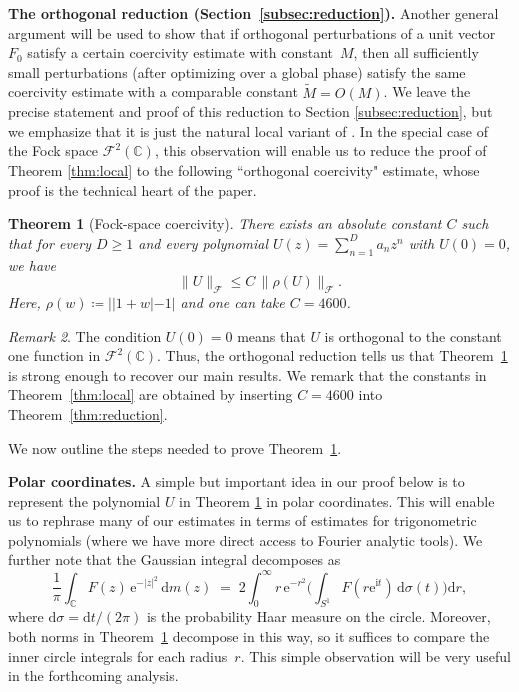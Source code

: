 \documentclass[11pt]{amsart}
\newtheorem{theorem}{Theorem}[section]
\theoremstyle{remark}
\newtheorem{remark}[theorem]{Remark}
\newcommand{\norm}[1]{\lVert #1 \rVert}
\begin{document}
\noindent
\textbf{The orthogonal reduction (Section~\ref{subsec:reduction}).}\;
Another general argument will be used to show that if orthogonal perturbations
of a unit vector $F_0$ satisfy a certain coercivity estimate with constant~$M$,
then all sufficiently small perturbations (after optimizing over a global
phase) satisfy the same coercivity estimate with a comparable constant $\widetilde{M} = O(M)$. We leave the precise statement and proof of this reduction to Section \ref{subsec:reduction}, but we emphasize that it is just the natural local variant of \cite[Theorem 3.10]{MR4800909}. In the special case of the Fock space $\mathcal{F}^2(\mathbb{C})$, this observation will enable us to reduce the proof of Theorem
\ref{thm:local} to the following ``orthogonal
coercivity" estimate, whose proof is the technical heart of the paper.

\begin{theorem}[Fock-space coercivity]\label{thm:orthog}
There exists an absolute constant $C$ such that for every $D \ge 1$ and every polynomial
$U(z) = \sum_{n=1}^D a_n z^n$ with $U(0) = 0$, we have
\[
  \norm{U}_{\mathcal{F}} \le C\,\norm{\rho(U)}_{\mathcal{F}}.
\]
Here, $\rho(w)\coloneq ||1+w|-1|$ and one can take $C = 4600$.
\end{theorem}
\begin{remark}
  The condition $U(0) = 0$ means that $U$ is orthogonal to the constant one
function in $\mathcal{F}^2(\mathbb{C})$. Thus, the orthogonal reduction tells us that Theorem~\ref{thm:orthog} is strong enough to recover our main results. We  remark that the constants in Theorem~\ref{thm:local} are obtained by inserting $C=4600$ into Theorem~\ref{thm:reduction}.
\end{remark}

We now outline the steps needed to prove Theorem~\ref{thm:orthog}.
\medskip

\noindent
\textbf{Polar coordinates.}\;
A simple but important idea in our proof below is to represent the polynomial $U$ in Theorem \ref{thm:orthog} in polar coordinates. This will enable us to rephrase many of our estimates in terms of estimates for trigonometric polynomials (where we have more direct access to Fourier analytic tools). We further note that the Gaussian integral decomposes as
\begin{equation}\label{eq:polar}
\frac{1}{\pi}\int_{\mathbb{C}} F(z)\, \mathrm{e}^{-\lvert z \rvert^2}\,\mathrm{d} m(z)
\;=\;
2\int_0^\infty r\,\mathrm{e}^{-r^2}
\biggl(\int_{S^1} F(r\mathrm{e}^{\mathrm{i} t})\,\mathrm{d}\sigma(t)\biggr)\mathrm{d} r,
\end{equation}
where $\mathrm{d}\sigma = \mathrm{d} t/(2\pi)$ is the probability Haar measure on the
circle. Moreover, both norms in Theorem~\ref{thm:orthog} decompose in this way, so it
suffices to compare the inner circle integrals for each radius~$r$. This simple observation will be very useful in the forthcoming analysis.
\end{document}
